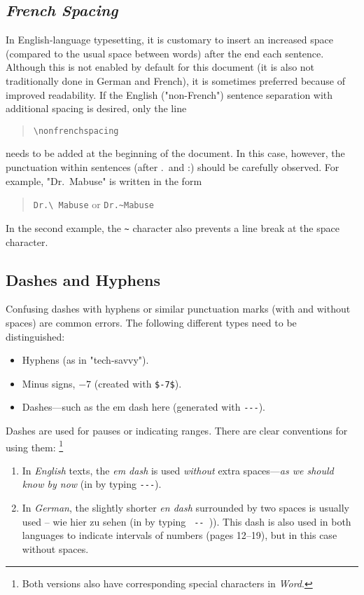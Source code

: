 \subsection{\emph{French Spacing}}

In English-language typesetting, it is customary to insert an increased space
(compared to the usual space between words) after the end each sentence.
Although this is not enabled by default for this document (it is also not
traditionally done in German and French), it is sometimes preferred because of
improved readability. If the English ("non-French") sentence separation with
additional spacing is desired, only the line
%
\begin{quote}
    \verb!\nonfrenchspacing!
\end{quote}
%
needs to be added at the beginning of the document. In this case, however, the
punctuation within sentences (after .\ and :) should be carefully observed. For
example, "Dr.\ Mabuse" is written in the form
%
\begin{quote}
    \verb!Dr.\ Mabuse! or \verb!Dr.~Mabuse!
\end{quote}
%
In the second example, the \verb!~! character also prevents a line break at the
space character.

\subsection{Dashes and Hyphens}
\label{sec:dash}

Confusing dashes with hyphens or similar punctuation marks (with and without
spaces) are common errors. The following different types need to be
distinguished:
%
\begin{itemize}
    \item Hyphens (as in "tech-savvy").
    \item Minus signs, \eg $-7$ (created with \verb!$-7$!).
    \item Dashes---such as the em dash here (generated with \verb!---!).
\end{itemize}
%
\noindent
Dashes are used for pauses or indicating ranges. There are clear conventions
for using them:%
\footnote{Both versions also have corresponding special characters in
\emph{Word}.}
%
\begin{enumerate}
	\item In \emph{English} texts, the \emph{em dash} is used \emph{without}
	extra spaces---\emph{as we should know by now} (in \latex by typing
	{\verb*!---!}).
	\item In \emph{German}, the slightly shorter \emph{en dash} surrounded by
	two spaces is usually used -- wie hier zu sehen (in \latex by typing
	{\verb*! -- !})). This dash is also used in both languages to indicate
	intervals of numbers (pages 12--19), but in this case without spaces.
\end{enumerate}

